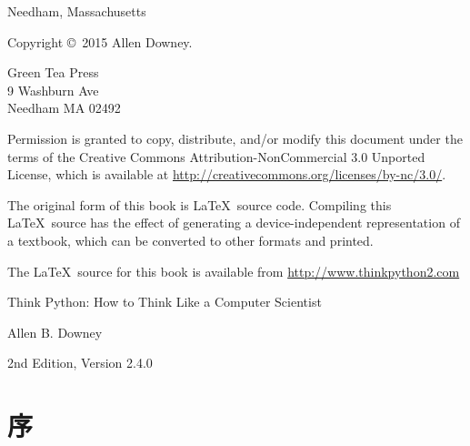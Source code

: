 \documentclass[10pt]{book}
\newcommand{\thetitle}{Think Python: How to Think Like a Computer Scientist}
\newcommand{\theversion}{2nd Edition, Version 2.4.0}
\newcommand{\thedate}{}
\begin{document}
\begin{latexonly}
\begin{flushright}
{\small Needham, Massachusetts}

\vfill

\end{flushright}


\pagebreak
\thispagestyle{empty}

{\small
Copyright \copyright ~2015 Allen Downey.


\vspace{0.2in}

\begin{flushleft}
Green Tea Press       \\
9 Washburn Ave        \\
Needham MA 02492
\end{flushleft}

Permission is granted to copy, distribute, and/or modify this document
under the terms of the Creative Commons Attribution-NonCommercial 3.0 Unported
License, which is available at \url{http://creativecommons.org/licenses/by-nc/3.0/}.

The original form of this book is \LaTeX\ source code.  Compiling this
\LaTeX\ source has the effect of generating a device-independent
representation of a textbook, which can be converted to other formats
and printed.

The \LaTeX\ source for this book is available from
\url{http://www.thinkpython2.com}

\vspace{0.2in}

} %

\end{latexonly}



\begin{htmlonly}


{\Large \thetitle}

{\large Allen B. Downey}

\theversion

\thedate

\setcounter{chapter}{-1}

\end{htmlonly}

\fi


\chapter{序}
\end{document}
